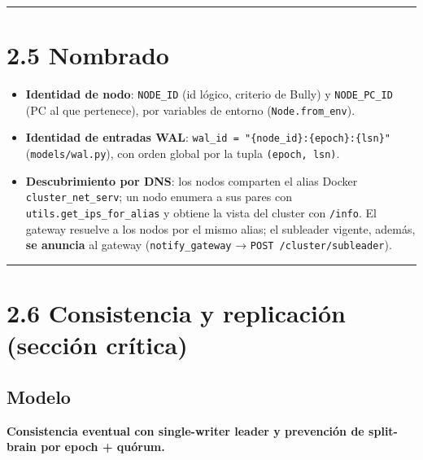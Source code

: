 \documentclass[11pt]{article}
\begin{document}
\vspace{2pt}\noindent\rule{\textwidth}{0.4pt}\vspace{2pt}

\section{2.5 Nombrado}

\begin{itemize}
\item \textbf{Identidad de nodo}: \texttt{NODE\_\allowbreak{}ID} (id lógico, criterio de Bully) y \texttt{NODE\_\allowbreak{}PC\_\allowbreak{}ID} (PC al que pertenece), por variables de entorno (\texttt{Node.\allowbreak{}from\_\allowbreak{}env}).
\item \textbf{Identidad de entradas WAL}: \texttt{wal\_\allowbreak{}id = "\{node\_\allowbreak{}id\}:\allowbreak{}\{epoch\}:\allowbreak{}\{lsn\}"} (\texttt{models/\allowbreak{}wal.\allowbreak{}py}), con orden global por la tupla \texttt{(epoch, lsn)}.
\item \textbf{Descubrimiento por DNS}: los nodos comparten el alias Docker \texttt{cluster\_\allowbreak{}net\_\allowbreak{}serv}; un nodo enumera a sus pares con \texttt{utils.\allowbreak{}get\_\allowbreak{}ips\_\allowbreak{}for\_\allowbreak{}alias} y obtiene la vista del cluster con \texttt{/\allowbreak{}info}. El gateway resuelve a los nodos por el mismo alias; el subleader vigente, además, \textbf{se anuncia} al gateway (\texttt{notify\_\allowbreak{}gateway} → \texttt{POST /\allowbreak{}cluster/\allowbreak{}subleader}).
\end{itemize}

\vspace{2pt}\noindent\rule{\textwidth}{0.4pt}\vspace{2pt}

\section{2.6 Consistencia y replicación (sección crítica)}

\subsection{Modelo}

\textbf{Consistencia eventual con single-writer leader y prevención de split-brain por epoch + quórum.}
\end{document}
